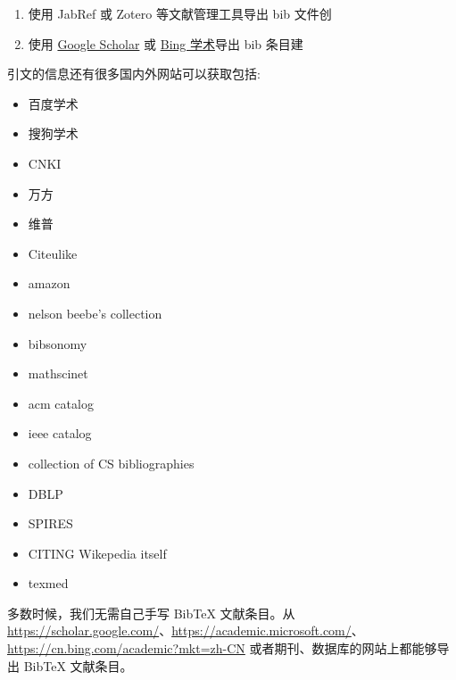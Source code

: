 \begin{enumerate}
\def\labelenumi{\arabic{enumi}.}

\item
  使用 JabRef 或 Zotero 等文献管理工具导出 bib 文件创
\item
  使用 \href{https://scholar.google.com/}{Google Scholar} 或
  \href{https://cn.bing.com/academic}{Bing 学术}导出 bib 条目建
\end{enumerate}

引文的信息还有很多国内外网站可以获取包括:
\begin{itemize}

  \item 百度学术

  \item 搜狗学术

  \item CNKI

  \item 万方

  \item 维普

  \item Citeulike

  \item amazon

  \item nelson beebe's collection

  \item bibsonomy

  \item mathscinet

  \item acm catalog

  \item ieee catalog

  \item collection of CS bibliographies

  \item DBLP

  \item SPIRES

  \item CITING Wikepedia itself

  \item texmed

\end{itemize}



多数时候，我们无需自己手写 BibTeX 文献条目。从
\url{https://scholar.google.com/}、\url{https://academic.microsoft.com/}、
\url{https://cn.bing.com/academic?mkt=zh-CN}
或者期刊、数据库的网站上都能够导出 BibTeX 文献条目。 


